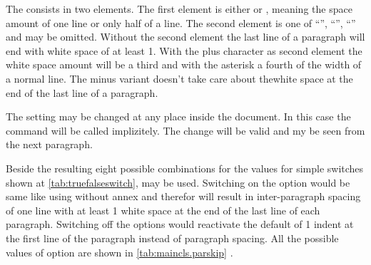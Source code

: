 \begin{Declaration}
\end{Declaration}
%

The  consists in two elements. The first element is either
 or , meaning the space amount of one line or only
half of a line. The second element is one of ``\PValue{*}'', ``\PValue{+}'',
``\PValue{-}'' and may be omitted. Without the second element the last line of
a paragraph will end with white space of at least 1. With the plus
character as second element the white space amount will be a third and with
the asterisk a fourth of the width of a normal line. The minus variant doesn't
take care about thewhite space at the end of the last line of a paragraph.

The setting may be changed at any place inside the document. In this case the
command %
will be called implizitely. The change will be valid and my be seen from the
next paragraph.

Beside the resulting eight possible combinations for  the values
for simple switches shown at \autoref{tab:truefalseswitch},
 may be used. Switching on the option would
be same like using  without annex and therefor will result in
inter-paragraph spacing of one line with at least 1 white space at
the end of the last line of each paragraph. Switching off the options would
reactivate the default of 1 indent at the first line of the
paragraph instead of paragraph spacing. All the possible values of option
 are shown in \autoref{tab:maincls.parskip}%
%
.

